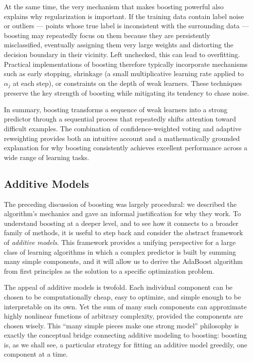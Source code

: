 At the same time, the very mechanism that makes boosting powerful also explains why regularization is important. If the training data contain label noise or outliers --- points whose true label is inconsistent with the surrounding data --- boosting may repeatedly focus on them because they are persistently misclassified, eventually assigning them very large weights and distorting the decision boundary in their vicinity. Left unchecked, this can lead to overfitting. Practical implementations of boosting therefore typically incorporate mechanisms such as early stopping, shrinkage (a small multiplicative learning rate applied to $\alpha_j$ at each step), or constraints on the depth of weak learners. These techniques preserve the key strength of boosting while mitigating its tendency to chase noise.

In summary, boosting transforms a sequence of weak learners into a strong predictor through a sequential process that repeatedly shifts attention toward difficult examples. The combination of confidence-weighted voting and adaptive reweighting provides both an intuitive account and a mathematically grounded explanation for why boosting consistently achieves excellent performance across a wide range of learning tasks.

\subsection*{Additive Models}

The preceding discussion of boosting was largely procedural: we described the algorithm's mechanics and gave an informal justification for why they work. To understand boosting at a deeper level, and to see how it connects to a broader family of methods, it is useful to step back and consider the abstract framework of \emph{additive models}. This framework provides a unifying perspective for a large class of learning algorithms in which a complex predictor is built by summing many simple components, and it will allow us to derive the AdaBoost algorithm from first principles as the solution to a specific optimization problem.

The appeal of additive models is twofold. Each individual component can be chosen to be computationally cheap, easy to optimize, and simple enough to be interpretable on its own. Yet the sum of many such components can approximate highly nonlinear functions of arbitrary complexity, provided the components are chosen wisely. This ``many simple pieces make one strong model'' philosophy is exactly the conceptual bridge connecting additive modeling to boosting: boosting is, as we shall see, a particular strategy for fitting an additive model greedily, one component at a time.

